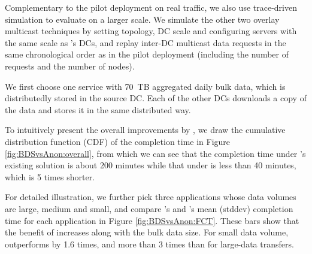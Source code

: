 Complementary to the pilot deployment on real traffic, we also use trace-driven simulation to evaluate \name on a larger scale.
We simulate the other two overlay multicast techniques by setting topology, DC scale and configuring servers with the same scale as \name's DCs, and replay inter-DC multicast data requests in the same chronological
order as in the pilot deployment (including the number of requests and the number of nodes).




We first choose one service with 70~TB aggregated daily bulk data, which is distributedly stored in the source DC. Each of the other DCs downloads a copy of the data and stores it in the same distributed way.


To intuitively present the overall improvements by \name, we draw the cumulative distribution function (CDF) of the completion time in Figure \ref{fig:BDSvsAnon:overall}, from which we can see that the completion time under \company's existing solution is about 200 minutes while that under \name is less than 40 minutes, which is 5 times shorter.

For detailed illustration, we further pick three applications whose data volumes are large, medium and small, and compare \name's and \company's mean (stddev) completion time for each application in Figure \ref{fig:BDSvsAnon:FCT}.
These bars show that the benefit of \name increases along with the bulk data size. For small data volume, \name outperforms \company by 1.6 times, and more than 3 times than \company for large-data transfers.

